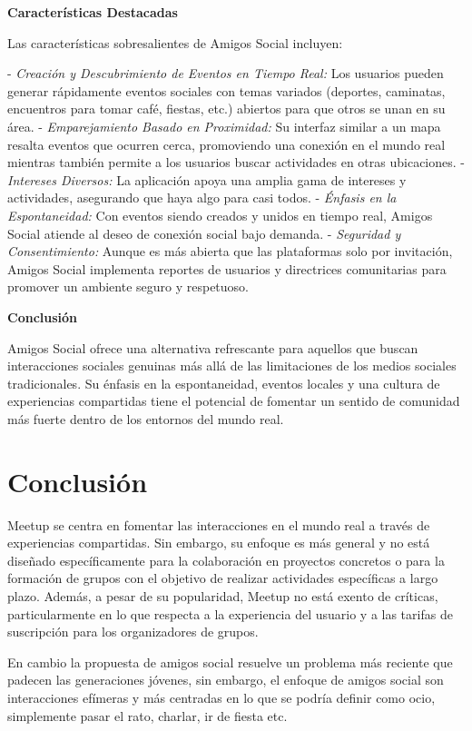 \textbf{Características Destacadas}

Las características sobresalientes de Amigos Social incluyen:

- \textit{Creación y Descubrimiento de Eventos en Tiempo Real:} Los usuarios pueden generar rápidamente eventos sociales con temas variados (deportes, caminatas, encuentros para tomar café, fiestas, etc.) abiertos para que otros se unan en su área.
- \textit{Emparejamiento Basado en Proximidad:} Su interfaz similar a un mapa resalta eventos que ocurren cerca, promoviendo una conexión en el mundo real mientras también permite a los usuarios buscar actividades en otras ubicaciones.
- \textit{Intereses Diversos:} La aplicación apoya una amplia gama de intereses y actividades, asegurando que haya algo para casi todos.
- \textit{Énfasis en la Espontaneidad:} Con eventos siendo creados y unidos en tiempo real, Amigos Social atiende al deseo de conexión social bajo demanda.
- \textit{Seguridad y Consentimiento:} Aunque es más abierta que las plataformas solo por invitación, Amigos Social implementa reportes de usuarios y directrices comunitarias para promover un ambiente seguro y respetuoso.

\textbf{Conclusión}

Amigos Social ofrece una alternativa refrescante para aquellos que buscan interacciones sociales genuinas más allá de las limitaciones de los medios sociales tradicionales. Su énfasis en la espontaneidad, eventos locales y una cultura de experiencias compartidas tiene el potencial de fomentar un sentido de comunidad más fuerte dentro de los entornos del mundo real.


\section{Conclusión}

Meetup se centra en fomentar las interacciones en el mundo real a 
través de experiencias compartidas. Sin embargo, su enfoque es más 
general y no está diseñado específicamente para la colaboración en 
proyectos concretos o para la formación de grupos con el objetivo de 
realizar actividades específicas a largo plazo. Además, a pesar de su 
popularidad, Meetup no está exento de críticas, particularmente en lo 
que respecta a la experiencia del usuario y a las tarifas de suscripción 
para los organizadores de grupos.

En cambio la propuesta de amigos social resuelve un problema más reciente que padecen las generaciones jóvenes, sin embargo, el enfoque de amigos social son interacciones efímeras y más centradas en lo que se podría definir como ocio, simplemente pasar el rato, charlar, ir de fiesta etc.

